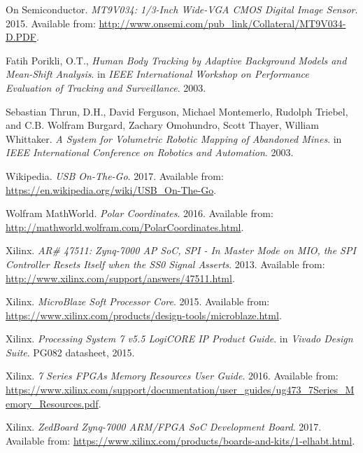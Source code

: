 \begin{thebibliography}{9}
On Semiconductor. 
\textit{MT9V034: 1/3-Inch Wide-VGA CMOS Digital Image Sensor}. 2015. 
Available from: \url{http://www.onsemi.com/pub_link/Collateral/MT9V034-D.PDF}.

Fatih Porikli, O.T.,
\textit{Human Body Tracking by Adaptive Background Models and Mean-Shift Analysis}.
in \textit{IEEE International Workshop on Performance Evaluation of Tracking and Surveillance}. 2003.

Sebastian Thrun, D.H., David Ferguson, Michael Montemerlo, Rudolph Triebel, and C.B. Wolfram Burgard, Zachary Omohundro, Scott Thayer, William Whittaker.
\textit{A System for Volumetric Robotic Mapping of Abandoned Mines}. 
in \textit{IEEE International Conference on Robotics and Automation}. 2003.

Wikipedia. \textit{USB On-The-Go}. 2017. Available from: \url{https://en.wikipedia.org/wiki/USB_On-The-Go}.

Wolfram MathWorld. \textit{Polar Coordinates}. 2016. Available from: \url{http://mathworld.wolfram.com/PolarCoordinates.html}.

Xilinx. \textit{AR\# 47511: Zynq-7000 AP SoC, SPI - In Master Mode on MIO, the SPI Controller Resets Itself when the SS0 Signal Asserts}. 2013. Available from: \url{http://www.xilinx.com/support/answers/47511.html}.

Xilinx. \textit{MicroBlaze Soft Processor Core}. 2015. Available from: \url{https://www.xilinx.com/products/design-tools/microblaze.html}.

Xilinx. \textit{Processing System 7 v5.5 LogiCORE IP Product Guide}. in \textit{Vivado Design Suite}. PG082 datasheet, 2015.

Xilinx. \textit{7 Series FPGAs Memory Resources User Guide}. 2016. Available from: \url{https://www.xilinx.com/support/documentation/user_guides/ug473_7Series_Memory_Resources.pdf}.

Xilinx. \textit{ZedBoard Zynq-7000 ARM/FPGA SoC Development Board}. 2017. Available from: \url{https://www.xilinx.com/products/boards-and-kits/1-elhabt.html}.

\end{thebibliography}




